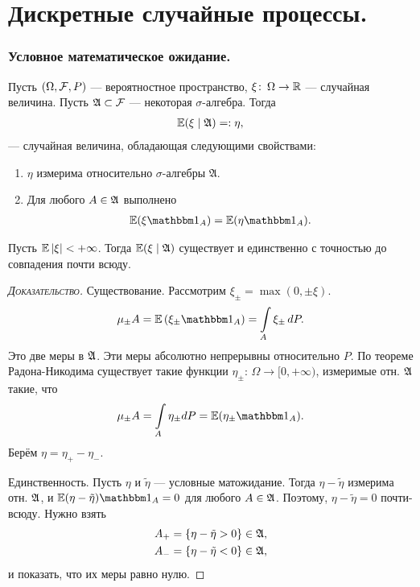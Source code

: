 \documentclass[../main.tex]{subfiles}
\begin{document}
\newpage
\part{Дискретные случайные процессы.}
\section{Условное математическое ожидание.}
\begin{df}
 Пусть $ (\Omega, \mathcal F, P) $ --- вероятностное пространство, $ \xi \colon \, \Omega \to \mathbb{R} $ --- случайная величина. Пусть $ \mathfrak A \subset \mathcal F $ --- некоторая $ \sigma $-алгебра. Тогда
 \begin{align*}
  \mathbb E(\xi \mid \mathfrak A) =: \eta,
 \end{align*} --- случайная величина, обладающая следующими свойствами:
 \begin{enumerate}
  \item $ \eta $ измерима относительно $ \sigma $-алгебры $ \mathfrak A $.
  \item Для любого $ A \in \mathfrak A $ выполнено
   \begin{align*}
    \E(\xi \Ind_A) = \E(\eta \Ind_A).
   \end{align*}
 \end{enumerate}
\end{df}
\begin{thm}
 Пусть $ \mathbb E \left| \xi \right| < +\infty $. Тогда $ \mathbb E(\xi\mid\mathfrak A) $ существует и единственно с точностью до совпадения почти всюду.
\end{thm}
\begin{proof}[\normalfont\textsc{Доказательство}]
 Существование. Рассмотрим $ \xi_\pm = \max(0, \pm \xi) $.
 \begin{align*}
  \mu_\pm A = \E \left( \xi_\pm \Ind_A \right) = \int\limits_{A} \xi_\pm \,dP. 
 \end{align*} Это две меры в $ \mathfrak A $. Эти меры абсолютно непрерывны относительно $ P $. По теореме Радона-Никодима существует такие функции $ \eta_\pm \colon\, \Omega \to [0, +\infty)  $, измеримые отн. $ \mathfrak A $ такие, что
 \begin{align*}
  \mu_\pm A = \int\limits_{A} \eta_\pm dP = \E (\eta_\pm \Ind_A).
 \end{align*} Берём $ \eta = \eta_+ - \eta_- $.

 Единственность. Пусть $ \eta  $ и $ \tilde \eta $ --- условные матожидание. Тогда
 $ \eta - \tilde \eta $ измерима отн. $ \mathfrak A $, и $ \E(\eta-\tilde\eta) \Ind_A = 0 $ для любого $ A \in \mathfrak A $. Поэтому, $ \eta - \tilde\eta = 0 $ почти-всюду. Нужно взять
 \begin{align*}
  A_+ &= \left\{ \eta - \tilde\eta > 0 \right\} \in \mathfrak A, \\
  A_- &= \left\{ \eta - \tilde\eta < 0 \right\} \in \mathfrak A,
 \end{align*} и показать, что их меры равно нулю.
\end{proof}
\end{document}
